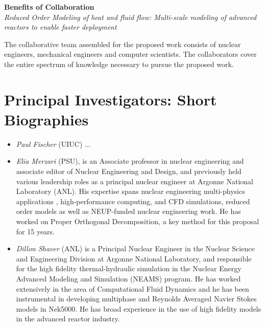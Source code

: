 
\parindent 0in
\parskip 0.1in

\begin{center}
{\bf Benefits of Collaboration } \\
{\it  Reduced Order Modeling of heat and fluid flow: Multi-scale modeling of advanced reactors to enable faster deployment }
\end{center}

The collaborative team assembled for the proposed work consists of nuclear engineers, mechanical engineers and computer scientists.  The collaborators cover the entire spectrum of knowledge necessary to pursue the proposed work.

\section{Principal Investigators: Short Biographies}
\begin{itemize}
\item \textit{Paul Fischer} (UIUC) ...
\item \textit{Elia Merzari} (PSU), is an Associate professor in nuclear engineering and associate editor of Nuclear Engineering and Design, and previously held various leadership
roles as a principal nuclear engineer at Argonne National Laboratory (ANL). His expertise spans nuclear engineering multi-physics applications , high-performance computing, and CFD simulations, reduced order models as well as NEUP-funded nuclear engineering work. He has worked on Proper Orthogonal Decomposition, a key method for this proposal for 15 years.
\item \textit{Dillon Shaver} (ANL) is a Principal Nuclear Engineer in the Nuclear Science and Engineering Division at Argonne National Laboratory, and responsible for the high fidelity thermal-hydraulic simulation in the Nuclear Energy Advanced Modeling and Simulation (NEAMS) program. He has worked extensively in the area of Computational Fluid Dynamics and he has been instrumental in developing multiphase and Reynolds Averaged Navier Stokes models in Nek5000. He has broad experience in the use of high fidelity models in the advanced reactor industry.
\end{itemize}
